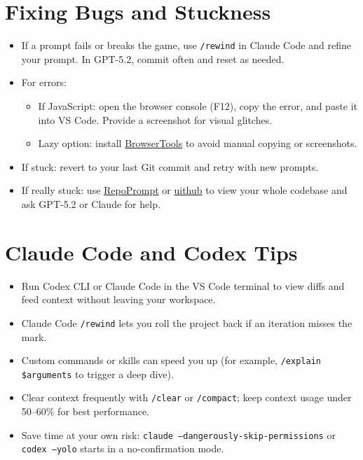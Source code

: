 \documentclass[12pt]{article}
\begin{document}
\section{Fixing Bugs and Stuckness}
\begin{itemize}
  \item If a prompt fails or breaks the game, use \texttt{/rewind} in Claude Code and refine your prompt. In GPT-5.2, commit often and reset as needed.
  \item For errors:
  \begin{itemize}
    \item If JavaScript: open the browser console (F12), copy the error, and paste it into VS Code. Provide a screenshot for visual glitches.
    \item Lazy option: install \href{https://browsertools.agentdesk.ai/installation}{BrowserTools} to avoid manual copying or screenshots.
  \end{itemize}
  \item If stuck: revert to your last Git commit and retry with new prompts.
  \item If really stuck: use \href{https://repoprompt.com/}{RepoPrompt} or \href{https://uithub.com/}{uithub} to view your whole codebase and ask GPT-5.2 or Claude for help.
\end{itemize}

\section{Claude Code and Codex Tips}
\begin{itemize}
  \item Run Codex CLI or Claude Code in the VS Code terminal to view diffs and feed context without leaving your workspace.
  \item Claude Code \texttt{/rewind} lets you roll the project back if an iteration misses the mark.
  \item Custom commands or skills can speed you up (for example, \texttt{/explain \$arguments} to trigger a deep dive).
  \item Clear context frequently with \texttt{/clear} or \texttt{/compact}; keep context usage under 50--60\% for best performance.
  \item Save time at your own risk: \texttt{claude --dangerously-skip-permissions} or \texttt{codex --yolo} starts in a no-confirmation mode.
\end{itemize}
\end{document}
